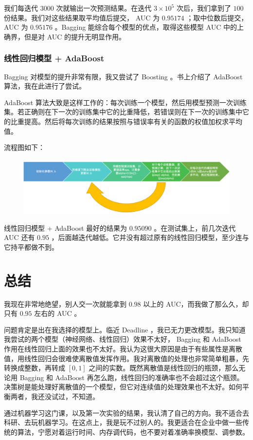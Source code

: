 \documentclass{article}
\begin{document}
我们每迭代 $3000$ 次就输出一次预测结果。在迭代 $3 \times 10^5$ 次后，我们拿到了 $100$ 份结果。我们对这些结果取平均值后提交， AUC 为 $0.95174$ ；取中位数后提交，AUC 为 $0.95176$ 。Bagging 能综合每个模型的优点，取得这些模型 AUC 中的上确界，但是对 AUC 的提升无明显作用。

\subsubsection{线性回归模型 + AdaBoost}

Bagging 对模型的提升非常有限，我又尝试了 Boosting 。书上介绍了 AdaBoost 算法，我在此进行了尝试。

AdaBoost 算法大致是这样工作的：每次训练一个模型，然后用模型预测一次训练集。若正确则在下一次的训练集中它的比重降低，若错误则在下一次的训练集中它的比重提高。然后将每次训练的结果按照与错误率有关的函数的权值加权求平均值。

流程图如下：

\begin{figure}[!h]
\centering
\includegraphics[scale=0.5]{5.png}
\end{figure}

线性回归模型 + AdaBoost 最好的结果为 $0.95090$ 。在测试集上，前几次迭代 AUC 还有 $0.95$ ，后面越迭代越低。它并没有超过原有的线性回归模型，至少连与它持平都做不到。

\section{总结}

我现在非常地绝望，别人交一次就能拿到 $0.98$ 以上的 AUC，而我做了那么久，却只有 $0.95$ 左右的 AUC 。

问题肯定是出在我选择的模型上。临近 Deadline ，我已无力更改模型。我只知道我尝试的两个模型（神经网络、线性回归）效果不太好， Bagging 和 AdaBoost 作用在线性回归上面的效果也不太好。我认为这很大原因是由于有些属性是离散值，用线性回归会很难使离散值发挥作用。我对离散值的处理也非常简单粗暴，先转换成整数，再转成 $[0, 1]$ 之间的实数。既然离散值是线性回归的瓶颈，那么无论用 Bagging 和 AdaBoost 再怎么跑，线性回归的准确率也不会超过这个瓶颈。决策树是能处理好离散值的一个模型，但它对连续值的处理效果也不太好。如何平衡两者，我还没试过，不知道。

通过机器学习这门课，以及第一次实验的结果，我认清了自己的方向。我不适合去科研、去玩机器学习。在这点上，我是玩不过别人的。我更适合在企业中做一些传统的算法，宁愿对着运行时间、内存调代码，也不要对着准确率换模型、调参数。
\end{document}
